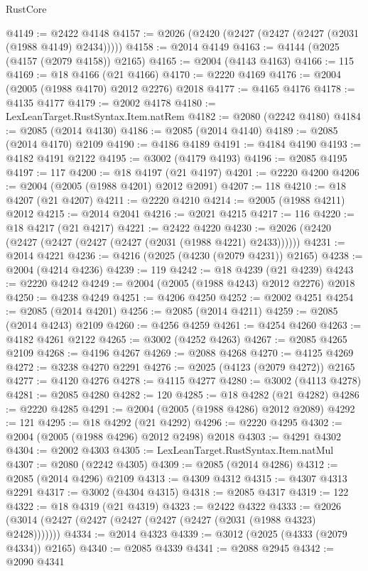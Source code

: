 \begin{lexlean}{RustCore}
\begin{coremodule}
@4149 := @2422 @4148
@4157 := @2026 (@2420 (@2427 (@2427 (@2427 (@2031 (@1988 @4149) @2434)))))
@4158 := @2014 @4149
@4163 := @4144 (@2025 (@4157 (@2079 @4158)) @2165)
@4165 := @2004 (@4143 @4163)
@4166 := 115
@4169 := @18 @4166 (@21 @4166)
@4170 := @2220 @4169
@4176 := @2004 (@2005 (@1988 @4170) @2012 @2276) @2018
@4177 := @4165 @4176
@4178 := @4135 @4177
@4179 := @2002 @4178
@4180 := LexLeanTarget.RustSyntax.Item.natRem
@4182 := @2080 (@2242 @4180)
@4184 := @2085 (@2014 @4130)
@4186 := @2085 (@2014 @4140)
@4189 := @2085 (@2014 @4170) @2109
@4190 := @4186 @4189
@4191 := @4184 @4190
@4193 := @4182 @4191 @2122
@4195 := @3002 (@4179 @4193)
@4196 := @2085 @4195
@4197 := 117
@4200 := @18 @4197 (@21 @4197)
@4201 := @2220 @4200
@4206 := @2004 (@2005 (@1988 @4201) @2012 @2091)
@4207 := 118
@4210 := @18 @4207 (@21 @4207)
@4211 := @2220 @4210
@4214 := @2005 (@1988 @4211) @2012
@4215 := @2014 @2041
@4216 := @2021 @4215
@4217 := 116
@4220 := @18 @4217 (@21 @4217)
@4221 := @2422 @4220
@4230 := @2026 (@2420 (@2427 (@2427 (@2427 (@2427 (@2031 (@1988 @4221) @2433))))))
@4231 := @2014 @4221
@4236 := @4216 (@2025 (@4230 (@2079 @4231)) @2165)
@4238 := @2004 (@4214 @4236)
@4239 := 119
@4242 := @18 @4239 (@21 @4239)
@4243 := @2220 @4242
@4249 := @2004 (@2005 (@1988 @4243) @2012 @2276) @2018
@4250 := @4238 @4249
@4251 := @4206 @4250
@4252 := @2002 @4251
@4254 := @2085 (@2014 @4201)
@4256 := @2085 (@2014 @4211)
@4259 := @2085 (@2014 @4243) @2109
@4260 := @4256 @4259
@4261 := @4254 @4260
@4263 := @4182 @4261 @2122
@4265 := @3002 (@4252 @4263)
@4267 := @2085 @4265 @2109
@4268 := @4196 @4267
@4269 := @2088 @4268
@4270 := @4125 @4269
@4272 := @3238 @4270 @2291
@4276 := @2025 (@4123 (@2079 @4272)) @2165
@4277 := @4120 @4276
@4278 := @4115 @4277
@4280 := @3002 (@4113 @4278)
@4281 := @2085 @4280
@4282 := 120
@4285 := @18 @4282 (@21 @4282)
@4286 := @2220 @4285
@4291 := @2004 (@2005 (@1988 @4286) @2012 @2089)
@4292 := 121
@4295 := @18 @4292 (@21 @4292)
@4296 := @2220 @4295
@4302 := @2004 (@2005 (@1988 @4296) @2012 @2498) @2018
@4303 := @4291 @4302
@4304 := @2002 @4303
@4305 := LexLeanTarget.RustSyntax.Item.natMul
@4307 := @2080 (@2242 @4305)
@4309 := @2085 (@2014 @4286)
@4312 := @2085 (@2014 @4296) @2109
@4313 := @4309 @4312
@4315 := @4307 @4313 @2291
@4317 := @3002 (@4304 @4315)
@4318 := @2085 @4317
@4319 := 122
@4322 := @18 @4319 (@21 @4319)
@4323 := @2422 @4322
@4333 := @2026 (@3014 (@2427 (@2427 (@2427 (@2427 (@2427 (@2031 (@1988 @4323) @2428)))))))
@4334 := @2014 @4323
@4339 := @3012 (@2025 (@4333 (@2079 @4334)) @2165)
@4340 := @2085 @4339
@4341 := @2088 @2945
@4342 := @2090 @4341

\end{coremodule}
\end{lexlean}
